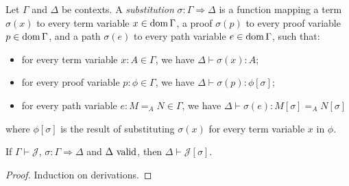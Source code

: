 Let $\Gamma$ and $\Delta$ be contexts.  A \emph{substitution} $\sigma : \Gamma \Rightarrow \Delta$
is a function mapping a term $\sigma(x)$ to every term variable $x \in \operatorname{dom} \Gamma$, a proof $\sigma(p)$ to
every proof variable $p \in \operatorname{dom} \Gamma$, and a path $\sigma(e)$ to every path variable $e \in \operatorname{dom} \Gamma$, such that:
\begin{itemize}
\item
for every term variable $x : A \in \Gamma$, we have $\Delta \vdash \sigma(x) : A$;
\item
for every proof variable $p : \phi \in \Gamma$, we have $\Delta \vdash \sigma(p) : \phi [ \sigma ]$;
\item
for every path variable $e : M =_A N \in \Gamma$, we have $\Delta \vdash \sigma(e) : M [ \sigma ] =_A N [ \sigma ]$
\end{itemize}
where $\phi [ \sigma ]$ is the result of substituting $\sigma(x)$ for every term variable $x$ in $\phi$.

\begin{code}%
\>  \AgdaSymbol{:}  \AgdaSymbol{\{}\AgdaSymbol{\}} \AgdaSymbol{\{}\AgdaSymbol{\}}            \<%
\end{code}

\begin{theorem}[Substitution]
If $\Gamma \vdash \mathcal{J}$, $\sigma : \Gamma \Rightarrow \Delta$ and $\Delta \ \mathrm{valid}$, then $\Delta \vdash \mathcal{J} [\sigma]$.
\end{theorem}

\begin{proof}
Induction on derivations.
\end{proof}

